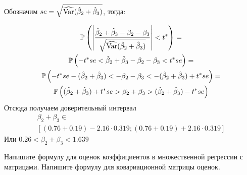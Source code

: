 \documentclass[pdftex,11pt,openany]{book}\usepackage[]{graphicx}\usepackage[]{color}
\begin{document}
\begin{solution}
\begin{enumerate}
Обозначим $se=\sqrt{\widehat{\operatorname{Var}}(\hat{\beta}_2 + \hat{\beta}_3)}$, тогда:

\begin{multline}
\mathbb{P}\left( \left| \frac{\hat{\beta}_2 + \hat{\beta}_3 - \beta_2 - \beta_3}{\sqrt{\widehat{\operatorname{Var}}(\hat{\beta}_2 + \hat{\beta}_3)}} \right| < t^* \right) = \\
\mathbb{P}\left( -t^* se < \hat{\beta}_2 + \hat{\beta}_3 - \beta_2 - \beta_3 < t^* se \right) = \\ 
\mathbb{P}\left( -t^*se  - (\hat{\beta}_2 + \hat{\beta}_3) < - \beta_2 - \beta_3  < -(\hat{\beta}_2 + \hat{\beta}_3) + t^* se \right) =\\ 
\mathbb{P}\left( (\hat{\beta}_2 + \hat{\beta}_3) + t^* se 
> \beta_2 + \beta_3 
> (\hat{\beta}_2 + \hat{\beta}_3) - t^* se \right) 
\end{multline}
Отсюда получаем доверительный интервал
\begin{multline}
\beta_2 + \beta_3 \in \\
[(0.76 + 0.19) - 2.16 \cdot 0.319;  (0.76 + 0.19) + 2.16 \cdot 0.319 ]
\end{multline}
Или $0.26< \beta_2 + \beta_3  < 1.639  $
\end{enumerate}
\end{solution}


\begin{problem}
Напишите формулу для оценок коэффициентов в множественной регрессии с матрицами. Напишите формулу для ковариационной матрицы оценок.
\end{problem}

\begin{solution}
\end{solution}
\end{document}
